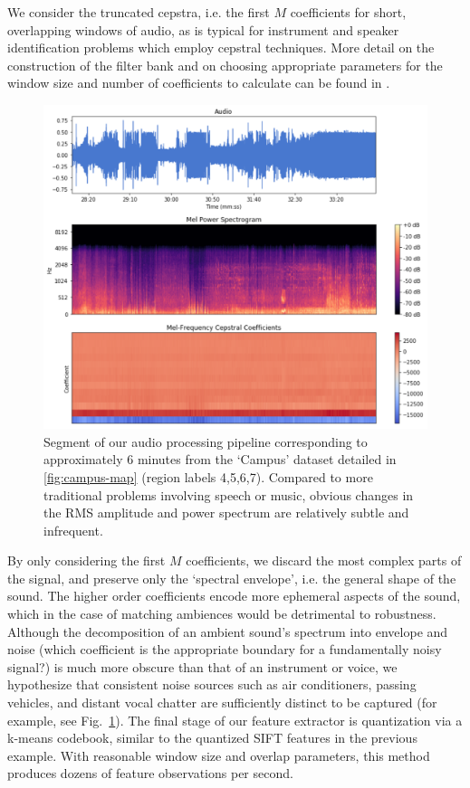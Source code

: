 We consider the truncated cepstra, i.e. the first $M$ coefficients for short, overlapping windows of audio, as is typical for instrument and speaker identification problems which employ cepstral techniques. More detail on the construction of the filter bank and on choosing appropriate parameters for the window size and number of coefficients to calculate can be found in \citep{Sturm2010}.

\begin{figure}
    \centering
    \includegraphics[width=\textwidth]{figures/audio/audio_processing.png}
    \caption{Segment of our audio processing pipeline corresponding to approximately 6 minutes from the `Campus' dataset detailed in \ref{fig:campus-map} (region labels 4,5,6,7). Compared to more traditional problems involving speech or music, obvious changes in the RMS amplitude and power spectrum are relatively subtle and infrequent.}
    \label{fig:audio-pipe}
\end{figure}

By only considering the first $M$ coefficients, we discard the most complex parts of the signal, and preserve only the `spectral envelope', i.e. the general shape of the sound. The higher order coefficients encode more ephemeral aspects of the sound, which in the case of matching ambiences would be detrimental to robustness.
Although the decomposition of an ambient sound's spectrum into envelope and noise (which coefficient is the appropriate boundary for a fundamentally noisy signal?) is much more obscure than that of an instrument or voice, we hypothesize that consistent noise sources such as air conditioners, passing vehicles, and distant vocal chatter are sufficiently distinct to be captured (for example, see Fig.~\ref{fig:audio-pipe}).  The final stage of our feature extractor is quantization via a k-means codebook, similar to the quantized SIFT features in the previous example. With reasonable window size and overlap parameters, this method produces dozens of feature observations per second.


